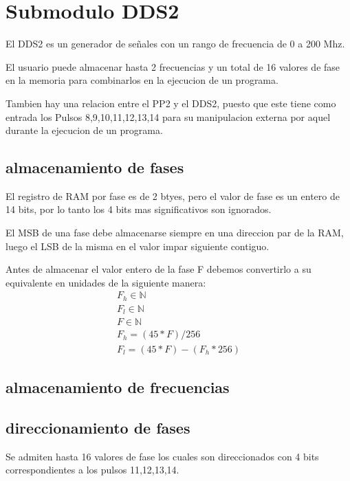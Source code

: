 \section{Submodulo DDS2}

El DDS2 es un generador de señales con un rango de frecuencia de 0 a 200 Mhz.

El usuario puede almacenar hasta 2 frecuencias y un total de 16 valores de fase
en la memoria para combinarlos en la ejecucion de un programa.

Tambien hay una relacion entre el PP2 y el DDS2, puesto que este tiene como entrada
los Pulsos 8,9,10,11,12,13,14 para su manipulacion externa por aquel durante
la ejecucion de un programa.

\subsection{almacenamiento de fases}

El registro de RAM por fase es de 2 btyes, pero el valor de fase es un entero de 14 bits,
por lo tanto los 4 bits mas significativos son ignorados.

El MSB de una fase debe almacenarse siempre en una direccion par de la RAM, luego
el LSB de la misma en el valor impar siguiente contiguo.

Antes de almacenar el valor entero de la fase F debemos convertirlo a su equivalente
en unidades de la siguiente manera:
\noindent
\begin{gather}
        F_h \in \mathbb{N} \\
        F_l \in \mathbb{N} \\
        F \in \mathbb{N} \\
        F_h = (45 * F) / 256 \\          
        F_l = (45 * F) - (F_h * 256)
\end{gather}




\subsection{almacenamiento de frecuencias}



\subsection{direccionamiento de fases}
Se admiten hasta 16 valores de fase los cuales son direccionados con 4 bits
correspondientes a los pulsos 11,12,13,14.

